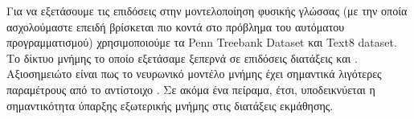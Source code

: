Για να εξετάσουμε τις επιδόσεις στην μοντελοποίηση φυσικής γλώσσας (με την οποία ασχολούμαστε επειδή βρίσκεται πιο κοντά στο πρόβλημα του αυτόματου προγραμματισμού) χρησιμοποιούμε τα Penn Treebank Dataset και Text8 dataset. Το δίκτυο μνήμης το οποίο εξετάσαμε ξεπερνά σε επιδόσεις διατάξεις  και . Αξιοσημειώτο είναι πως το νευρωνικό μοντέλο μνήμης έχει σημαντικά λιγότερες παραμέτρους από το αντίστοιχο . Σε ακόμα ένα πείραμα, έτσι, υποδεικνύεται η σημαντικότητα ύπαρξης εξωτερικής μνήμης στις διατάξεις εκμάθησης.

\section{}


